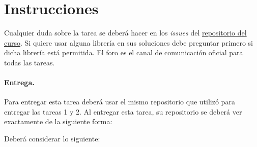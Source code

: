 
\section*{Instrucciones}

Cualquier duda sobre la tarea se deberá hacer en los \emph{issues} del \href{https://github.com/UC-IIC3253/2022}{repositorio del curso}. Si quiere usar alguna librería en sus soluciones debe preguntar primero si dicha librería está permitida. El foro es el canal de comunicación oficial para todas las tareas.

\paragraph{Entrega.} Para entregar esta tarea deberá usar el mismo repositorio que utilizó para entregar las tareas 1 y 2. Al entregar esta tarea, su repositorio se deberá ver exactamente de la siguiente forma:

\bigskip


\bigskip

Deberá considerar lo siguiente:

